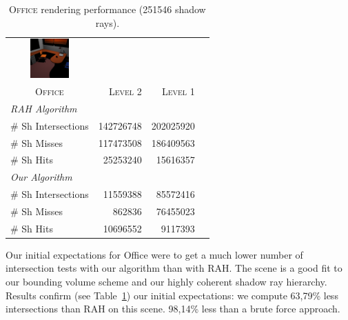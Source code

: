 \documentclass{egpubl}
\begin{document}
\begin{table}[!htb]
\begin{center}
\fontsize{7}{9}
\selectfont
\begin{tabular}{l|rrr}
    \multicolumn{1}{c}{\includegraphics[width=1.5cm]{Images/Office_Preview}} & & \\
    \multicolumn{1}{c|}{\textsc{Office}} & \textsc{Level 2} & \textsc{Level 1}\\
    \hline
    \emph{RAH Algorithm} & & \\
    \hline
    \quad \# Sh Intersections  & 142726748  & 202025920 \\
    \quad \# Sh Misses            & 117473508  & 186409563 \\
    \quad \# Sh Hits              & 25253240   & 15616357  \\
    \hline
    \emph{Our Algorithm} & & \\
    \hline
    \quad \# Sh Intersections  & 11559388   & 85572416	\\
    \quad \# Sh Misses         & 862836     & 76455023  \\
    \quad \# Sh Hits           & 10696552   & 9117393   \\
\end{tabular}
\end{center}
\caption{\label{table:office-results}
\textsc{Office} rendering performance (251546 shadow rays).}
\end{table}

Our initial expectations for Office were to get a much lower number of intersection tests with our algorithm than with RAH. The scene is a good fit to our bounding volume scheme and our highly coherent shadow ray hierarchy. Results confirm (see Table~\ref{table:office-results}) our initial expectations: we compute 63,79\% less intersections than RAH on this scene. 98,14\% less than a brute force approach.
\end{document}
